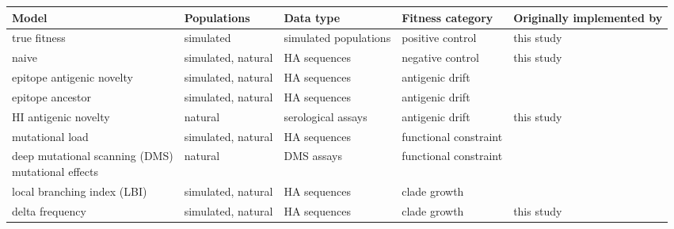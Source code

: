 \begin{tabular*}{1.4\textwidth}{lllll}
\toprule
Model                                                        & Populations        & Data type             & Fitness category      & Originally implemented by                   \\
\midrule
true fitness                                                 & simulated          & simulated populations & positive control      & this study                      \\
naive                                                        & simulated, natural & HA sequences          & negative control      & this study                      \\
epitope antigenic novelty                                    & simulated, natural & HA sequences          & antigenic drift       & \cite{Luksza:2014hj} \\
epitope ancestor                                             & simulated, natural & HA sequences          & antigenic drift       & \cite{Luksza:2014hj} \\
HI antigenic novelty                                         & natural            & serological assays    & antigenic drift       & this study                      \\
mutational load                                              & simulated, natural & HA sequences          & functional constraint & \cite{Luksza:2014hj} \\
\makecell{deep mutational scanning (DMS) \\ mutational effects} & natural            & DMS assays            & functional constraint & \cite{Lee2018}              \\
local branching index (LBI)                                  & simulated, natural & HA sequences          & clade growth          & \cite{Neher:2014eu}       \\
delta frequency                                              & simulated, natural & HA sequences          & clade growth          & this study                      \\
\bottomrule
\end{tabular*}
